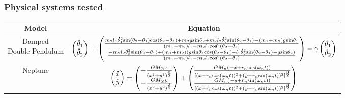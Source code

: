 \documentclass[aps,pre,reprint,superscriptaddress,nofootinbib,amsmath,amssymb]{revtex4-2}
\begin{document}
\subsubsection{Physical systems tested}\label{sec:physica_system_tested}

\begin{table*}[ht]
    \centering
    \begin{tabular}{|c|c|}\hline
    Model    &  Equation \\\hline
    \shortstack{Damped \\ Double Pendulum}  &  $ \begin{pmatrix}
		\ddot{\theta}_1\\
		\ddot{\theta}_2
	\end{pmatrix}=
	\begin{pmatrix}
		\frac{m_2l_1\dot{\theta}_1^2{\rm sin}(\theta_2-\theta_1){\rm cos}(\theta_2-\theta_1)+m_2g{\rm sin}\theta_2+m_2l_2\dot{\theta}_2^2{\rm sin}(\theta_2-\theta_1)-(m_1+m_2)g{\rm sin}\theta_1}{(m_1+m_2)l_1-m_2l_1{\rm cos}^2(\theta_2-\theta_1)}\\
		\frac{-m_2l_2\dot{\theta}_2^2{\rm sin}(\theta_2-\theta_1)+(m_1+m_2)(g{\rm sin}\theta_1{\rm cos}(\theta_2-\theta_1)-l_1\dot{\theta}_2^2{\rm sin}(\theta_2-\theta_1)-g{\rm sin}\theta_2)}{(m_1+m_2)l_1-m_2l_1{\rm cos}^2(\theta_2-\theta_1)}
	\end{pmatrix}
	-\gamma \begin{pmatrix}
		\dot{\theta}_1\\
		\dot{\theta}_2
	\end{pmatrix}$ \\\hline 
	Neptune & $\begin{pmatrix}
		\ddot{x}\\
		\ddot{y}\\
	\end{pmatrix}=
	\begin{pmatrix}
		-\frac{GM_\odot x}{(x^2+y^2)^{\frac{3}{2}}}\\
		-\frac{GM_\odot y}{(x^2+y^2)^{\frac{3}{2}}}\\
	\end{pmatrix}
	+
	\begin{pmatrix}
		\frac{ GM_n(-x+r_n{\rm cos}(\omega_n t))}{[(x-r_n{\rm cos}(\omega_n t))^2+(y-r_n{\rm sin}(\omega_n t))^2]^{\frac{3}{2}}}\\
		\frac{ GM_n(-y+r_n{\rm sin}(\omega_n t))}{[(x-r_n{\rm cos}(\omega_n t))^2+(y-r_n{\rm sin}(\omega_n t))^2]^{\frac{3}{2}}}\\
	\end{pmatrix}$\\\hline

\end{tabular}
\end{table*}
\end{document}
